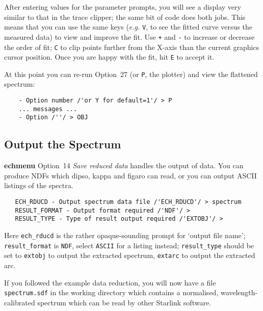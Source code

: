 \documentclass[twoside,11pt]{article}
\newcommand{\xref}[3]{#1}
\newcommand{\scspec}[2]{#1}
\newcommand{\scspec}[2]{#2}
\begin{document}
After entering values for the parameter prompts, you will see a display
very similar to that in the trace clipper; the same bit of code does both
jobs.  This means that you can use the same keys ({\it{e.g.}} \verb+V+, to
see the fitted curve versus the measured data) to view and improve the fit.
Use \verb=+= and \verb=-= to increase or decrease the order of fit; \verb+C+
to clip points further from the X-axis than the current graphics cursor
position.  Once you are happy with the fit, hit \verb+E+ to accept it.

At this point you can re-run
\xref{Option~27 (or {\tt{P}}, the plotter)}{sun152}{option27}
and view the flattened spectrum:

{
\scspec{\small}{ }
\begin{verbatim}
    - Option number /'or Y for default=1'/ > P
    ... messages ...
    - Option /''/ > OBJ
\end{verbatim}
}


\subsection{Output the Spectrum}

\xref{{\bf echmenu}}{sun152}{ECHMENU}
\xref{Option~14 {\sl Save reduced data}}{sun152}{option14}
handles the output of data.
You can produce NDFs which \xref{{\sc dipso}}{sun50}{}\cite{dipso},
\xref{{\sc kappa}}{sun95}{} and \xref{{\sc figaro}}{sun86}{} can read,
or you can output ASCII listings of the spectra.

{
\scspec{\small}{ }
\begin{verbatim}
   ECH_RDUCD - Output spectrum data file /'ECH_RDUCD'/ > spectrum
   RESULT_FORMAT - Output format required /'NDF'/ >
   RESULT_TYPE - Type of result output required /'EXTOBJ'/ >
\end{verbatim}
}

Here
\xref{{\tt ech\_rducd}}{sun152}{par_ECH_RDUCD} is the rather opaque-sounding
prompt for `output file name';
\xref{{\tt result\_format}}{sun152}{par_RESULT_FORMAT} is \verb+NDF+,
select \verb+ASCII+ for a listing instead;
\xref{{\tt result\_type}}{sun152}{par_RESULT_TYPE} should be set to
\verb+extobj+ to output the extracted spectrum, \verb+extarc+ to output
the extracted arc.

If you followed the example data reduction, you will now have a file
\verb+spectrum.sdf+ in the working directory which contains a normalised,
wavelength-calibrated spectrum which can be read by other Starlink
software.
\end{document}
